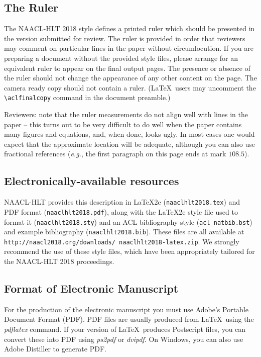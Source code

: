 \documentclass[11pt,a4paper]{article}
\begin{document}
\subsection{The Ruler}
The NAACL-HLT 2018 style defines a printed ruler which should be presented in the
version submitted for review.  The ruler is provided in order that
reviewers may comment on particular lines in the paper without
circumlocution.  If you are preparing a document without the provided
style files, please arrange for an equivalent ruler to
appear on the final output pages.  The presence or absence of the ruler
should not change the appearance of any other content on the page.  The
camera ready copy should not contain a ruler. (\LaTeX\ users may uncomment the {\small\verb|\aclfinalcopy|} command in the document preamble.)  

Reviewers: note that the ruler measurements do not align well with
lines in the paper -- this turns out to be very difficult to do well
when the paper contains many figures and equations, and, when done,
looks ugly. In most cases one would expect that the approximate
location will be adequate, although you can also use fractional
references ({\em e.g.}, the first paragraph on this page ends at mark $108.5$).

\subsection{Electronically-available resources}

NAACL-HLT provides this description in \LaTeX2e{} ({\small\tt naaclhlt2018.tex}) and PDF
format ({\small\tt naaclhlt2018.pdf}), along with the \LaTeX2e{} style file used to
format it ({\small\tt naaclhlt2018.sty}) and an ACL bibliography style ({\small\tt acl\_natbib.bst})
and example bibliography ({\small\tt naaclhlt2018.bib}).
These files are all available at
{\small\tt http://naacl2018.org/downloads/ naaclhlt2018-latex.zip}. 
 We
strongly recommend the use of these style files, which have been
appropriately tailored for the NAACL-HLT 2018 proceedings.

\subsection{Format of Electronic Manuscript}
\label{sect:pdf}

For the production of the electronic manuscript you must use Adobe's
Portable Document Format (PDF). PDF files are usually produced from
\LaTeX\ using the \textit{pdflatex} command. If your version of
\LaTeX\ produces Postscript files, you can convert these into PDF
using \textit{ps2pdf} or \textit{dvipdf}. On Windows, you can also use
Adobe Distiller to generate PDF.
\end{document}
